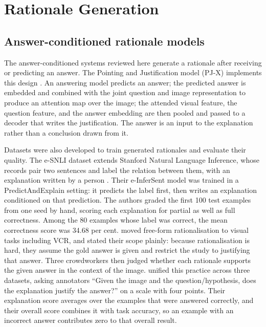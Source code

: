 \section{Rationale Generation}
\label{sec:background-rationales}

\subsection{Answer-conditioned rationale models}
\label{sec:background-answer-conditioning}

The answer-conditioned systems reviewed here generate a rationale after receiving
or predicting an answer. The Pointing and Justification model (PJ-X) implements
this design \citep{DBLP:conf/cvpr/ParkHARSDR18}. An answering model predicts an
answer; the predicted answer is embedded and combined with the joint question and
image representation to produce an attention map over the image; the attended visual
feature, the question feature, and the answer embedding are then pooled and passed
to a decoder that writes the justification. The answer is an input to the
explanation rather than a conclusion drawn from it.

Datasets were also developed to train generated rationales and evaluate their
quality. The e-SNLI dataset extends Stanford Natural Language Inference, whose
records pair two sentences and label the relation between
them, with an explanation written by a person \citep{CamburuEtAl18ESNLI}. Their
e-InferSent model was trained in a PredictAndExplain setting: it predicts the label
first, then writes an explanation conditioned on that prediction. The authors graded
the first 100 test examples from one seed by hand, scoring each explanation for
partial as well as full correctness. Among the 80 examples whose label was correct,
the mean correctness score was 34.68 per cent.
\citet{DBLP:conf/emnlp/MarasovicBPLSC20} moved free-form rationalisation to visual
tasks including VCR, and stated their scope plainly: because rationalisation is
hard, they assume the gold answer is given and restrict the study to justifying
that answer. Three crowdworkers then judged whether each rationale supports the
given answer in the context of the image. \citet{KayserEtAl21EVIL} unified this
practice across three datasets, asking annotators \enquote{Given the image and the
question/hypothesis, does the explanation justify the answer?} on a scale with four
points. Their explanation score averages over the examples that were answered
correctly, and their overall score combines it with task accuracy, so an example
with an incorrect answer contributes zero to that overall result.

